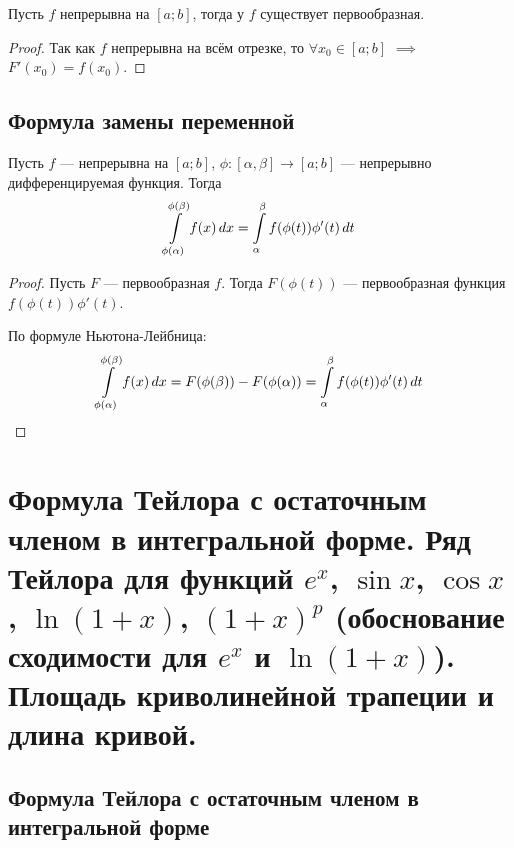\documentclass[a4paper]{article}
\theoremstyle{named}
\renewcommand{\int}{\intop}
\begin{document}
        \begin{consequence*}
            Пусть $f$ непрерывна на $[a; b]$, тогда у $f$ существует первообразная.
        \end{consequence*}

        \begin{proof}
            Так как $f$ непрерывна на всём отрезке, то $\forall x_0 \in [a; b]$ $\implies$ $F'(x_0) = f(x_0)$.
        \end{proof}

        \subsection{Формула замены переменной}

        \begin{consequence*}
            Пусть $f$ --- непрерывна на $[a; b]$, $\phi: [\alpha, \beta] \to [a; b]$ --- непрерывно дифференцируемая функция. Тогда
            \begin{equation*}
                \int_{\phi(\alpha)}^{\phi(\beta)} f(x) \dd x = \int_{\alpha}^{\beta} f(\phi(t)) \phi'(t) \dd t
            \end{equation*}
        \end{consequence*}

        \begin{proof}
            Пусть $F$ --- первообразная $f$. Тогда $F(\phi(t))$ --- первообразная функция $f(\phi(t)) \phi'(t)$. 

            По формуле Ньютона-Лейбница:
            \begin{equation*}
                \int_{\phi(\alpha)}^{\phi(\beta)} f(x) \dd x = F(\phi(\beta)) - F(\phi(\alpha)) = \int_{\alpha}^{\beta} f(\phi(t)) \phi'(t) \dd t
            \end{equation*}
        \end{proof}

    \section{Формула Тейлора с остаточным членом в интегральной форме. Ряд Тейлора для функций $e^x$, $\sin x$, $\cos x$, $\ln(1 + x)$, $(1 + x)^p$ (обоснование сходимости для $e^x$ и $\ln(1 + x)$). Площадь криволинейной трапеции и длина кривой.}

    	\subsection{Формула Тейлора с остаточным членом в интегральной форме}
\end{document}
